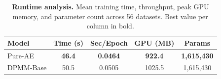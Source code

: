 \begin{table}[!htbp]
\centering
\caption{\textbf{Runtime analysis.} Mean training time, throughput, peak GPU memory, and parameter count across 56 datasets. Best value per column in bold.}
\label{tab:dpmm_runtime}
\begin{tabular}{lcccc}
\toprule
Model & Time (s) & Sec/Epoch & GPU (MB) & Params \\
\midrule
Pure-AE & \textbf{46.4} & \textbf{0.0464} & \textbf{922.4} & \textbf{1,615,430} \\
DPMM-Base & 50.5 & 0.0505 & 1025.5 & 1,615,430 \\
\bottomrule
\end{tabular}
\end{table}
